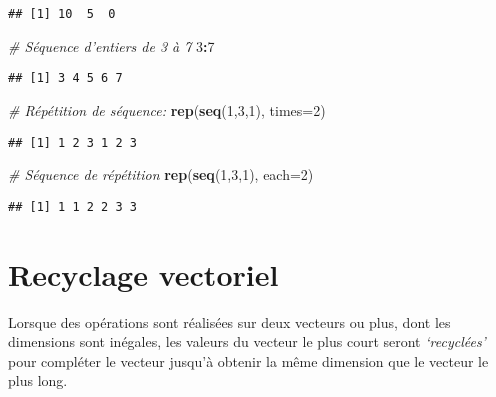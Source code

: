 \documentclass[]{book}
\newenvironment{Shaded}{\begin{snugshade}}{\end{snugshade}}
\newcommand{\CommentTok}[1]{\textcolor[rgb]{0.56,0.35,0.01}{\textit{#1}}}
\newcommand{\DataTypeTok}[1]{\textcolor[rgb]{0.13,0.29,0.53}{#1}}
\newcommand{\DecValTok}[1]{\textcolor[rgb]{0.00,0.00,0.81}{#1}}
\newcommand{\KeywordTok}[1]{\textcolor[rgb]{0.13,0.29,0.53}{\textbf{#1}}}
\newcommand{\NormalTok}[1]{#1}
\newcommand{\OperatorTok}[1]{\textcolor[rgb]{0.81,0.36,0.00}{\textbf{#1}}}
\begin{document}
\begin{verbatim}
## [1] 10  5  0
\end{verbatim}

\begin{Shaded}
\begin{Highlighting}[]
\CommentTok{# Séquence d'entiers de 3 à 7}
\DecValTok{3}\OperatorTok{:}\DecValTok{7}
\end{Highlighting}
\end{Shaded}

\begin{verbatim}
## [1] 3 4 5 6 7
\end{verbatim}

\begin{Shaded}
\begin{Highlighting}[]
\CommentTok{# Répétition de séquence:}
\KeywordTok{rep}\NormalTok{(}\KeywordTok{seq}\NormalTok{(}\DecValTok{1}\NormalTok{,}\DecValTok{3}\NormalTok{,}\DecValTok{1}\NormalTok{), }\DataTypeTok{times=}\DecValTok{2}\NormalTok{)}
\end{Highlighting}
\end{Shaded}

\begin{verbatim}
## [1] 1 2 3 1 2 3
\end{verbatim}

\begin{Shaded}
\begin{Highlighting}[]
\CommentTok{# Séquence de répétition}
\KeywordTok{rep}\NormalTok{(}\KeywordTok{seq}\NormalTok{(}\DecValTok{1}\NormalTok{,}\DecValTok{3}\NormalTok{,}\DecValTok{1}\NormalTok{), }\DataTypeTok{each=}\DecValTok{2}\NormalTok{)}
\end{Highlighting}
\end{Shaded}

\begin{verbatim}
## [1] 1 1 2 2 3 3
\end{verbatim}

\hypertarget{recyclage-vectoriel}{%
\section{Recyclage vectoriel}\label{recyclage-vectoriel}}

Lorsque des opérations sont réalisées sur deux vecteurs ou plus, dont les dimensions sont inégales, les valeurs du vecteur le plus court seront \emph{`recyclées'} pour compléter le vecteur jusqu'à obtenir la même dimension que le vecteur le plus long.
\end{document}
